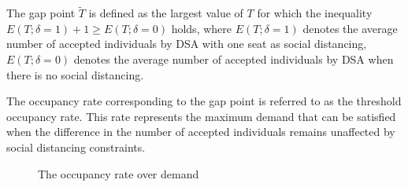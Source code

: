 

The gap point $\tilde{T}$ is defined as the largest value of $T$ for which the inequality $E(T; \delta =1)+1 \geq E(T; \delta = 0)$ holds, where $E(T; \delta =1)$ denotes the average number of accepted individuals by DSA with one seat as social distancing, $E(T; \delta = 0)$ denotes the average number of accepted individuals by DSA when there is no social distancing.

The occupancy rate corresponding to the gap point is referred to as the threshold occupancy rate. This rate represents the maximum demand that can be satisfied when the difference in the number of accepted individuals remains unaffected by social distancing constraints.

\begin{figure}[h]
  \centering
  \caption{The occupancy rate over demand}
  \label{occupancy_rate_demand}
\end{figure}

